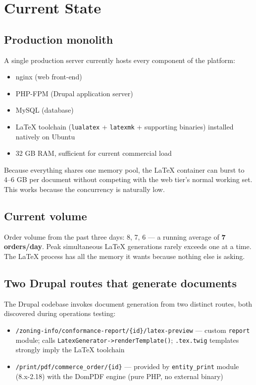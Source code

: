 \documentclass[11pt,letterpaper]{article}
\begin{document}
\newpage

\section{Current State}
\label{sec:current-state}

\subsection{Production monolith}
A single production server currently hosts every component of the platform:

\begin{itemize}[nosep]
  \item nginx (web front-end)
  \item PHP-FPM (Drupal application server)
  \item MySQL (database)
  \item LaTeX toolchain (\texttt{lualatex} + \texttt{latexmk} + supporting binaries) installed natively on Ubuntu
  \item 32 GB RAM, sufficient for current commercial load
\end{itemize}

Because everything shares one memory pool, the LaTeX container can burst to 4--6 GB per document without competing with the web tier's normal working set. This works because the concurrency is naturally low.

\subsection{Current volume}
Order volume from the past three days: 8, 7, 6 --- a running average of \textbf{7 orders/day}. Peak simultaneous LaTeX generations rarely exceeds one at a time. The LaTeX process has all the memory it wants because nothing else is asking.

\subsection{Two Drupal routes that generate documents}
The Drupal codebase invokes document generation from two distinct routes, both discovered during operations testing:

\begin{itemize}[nosep]
  \item \texttt{/zoning-info/conformance-report/\{id\}/latex-preview} --- custom \texttt{report} module; calls \texttt{LatexGenerator->renderTemplate()}; \texttt{.tex.twig} templates strongly imply the LaTeX toolchain
  \item \texttt{/print/pdf/commerce\_order/\{id\}} --- provided by \texttt{entity\_print} module (8.x-2.18) with the DomPDF engine (pure PHP, no external binary)
\end{itemize}
\end{document}
